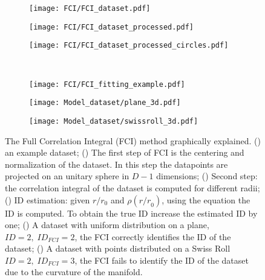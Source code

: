 \documentclass[11pt,a4paper]{article}
\author{Jacopo Fadanni}
\begin{document}
\begin{figure}
 \centering
 \begin{subfigure}[b]{0.32\textwidth}
   \centering
   \texttt{[image: FCI/FCI\_dataset.pdf]}
   \subcaption{}\label{fig:FCIexpl:FCI_dataset}
 \end{subfigure}
 \begin{subfigure}[b]{0.32\textwidth}
   \centering
   \texttt{[image: FCI/FCI\_dataset\_processed.pdf]}
   \subcaption{}\label{fig:FCIexpl:FCI_dataset_processed}
 \end{subfigure}
 \begin{subfigure}[b]{0.32\textwidth}
    \centering
    \texttt{[image: FCI/FCI\_dataset\_processed\_circles.pdf]}
    \subcaption{}\label{fig:FCIexpl:FCI_dataset_processed_circles}
  \end{subfigure}\\ 
  \begin{subfigure}[b]{0.36\textwidth}
    \centering
    \texttt{[image: FCI/FCI\_fitting\_example.pdf]}
    \subcaption{}\label{fig:FCIexpl:FCI_fitting_example}
  \end{subfigure}
  \begin{subfigure}[b]{0.30\textwidth}
    \centering
    \texttt{[image: Model\_dataset/plane\_3d.pdf]}
    \subcaption{}\label{fig:FCIexpl:Model_dataset_plane_3d}
  \end{subfigure}
  \begin{subfigure}[b]{0.30\textwidth}
    \centering
    \texttt{[image: Model\_dataset/swissroll\_3d.pdf]}
    \subcaption{}\label{fig:FCIexpl:Model_dataset_swissroll_3d}
  \end{subfigure}
 \caption{The Full Correlation Integral (FCI) method graphically explained.
 () an example dataset;
 () The first step of FCI is the centering and normalization of the dataset. In this step the datapoints are projected on an unitary sphere in $D-1$ dimensions;
 () Second step: the correlation integral of the dataset is computed for different radii;
 () ID estimation: given $r/r_0$ and $\rho({r/r}_0)$, using the equation %
 the ID is computed. To obtain the true ID increase the estimated ID by one;
 () A dataset with uniform distribution on a plane, $ID=2, \; ID_{FCI}=2$, the FCI correctly identifies the ID of the dataset;
 () A dataset with points distributed on a Swiss Roll $ID=2, \; ID_{FCI}=3$,
  the FCI fails to identify the ID of the dataset due to the curvature of the manifold.}\label{fig:FCIexpl}
 \end{figure}
\end{document}
